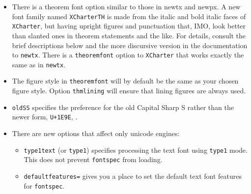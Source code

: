 \documentclass[11pt]{article}
\begin{document}
\begin{itemize}
\item
There is a theorem font option similar to those in newtx and newpx. A new font family named {\tt XCharterTH} is made from the italic and bold italic faces of {\tt XCharter}, but having upright figures and punctuation that, IMO, look better than slanted ones in theorem statements and the like. For details, consult the brief descriptions below and the more discursive version in the documentation to {\tt newtx}. There is a {\tt theoremfont} option to {\tt XCharter} that works exactly the same as in {\tt newtx}.
\item The figure style in {\tt theoremfont} will by default be the same as your chosen figure style. Option {\tt thmlining} will ensure that lining figures are always used.
\item {\tt oldSS} specifies the preference for the old Capital Sharp S rather than the newer form, {\tt U+1E9E}\iftutex, \SS\fi.
\item There are new options that affect only unicode engines:
\begin{itemize}
\item {\tt type1text} (or {\tt type1})  specifies processing the text font using {\tt type1} mode. This does not prevent {\tt fontspec} from loading.
\item {\tt defaultfeatures=} gives you a place to set the default text font features for {\tt fontspec}.
\end{itemize}
\end{itemize}
\end{document}
